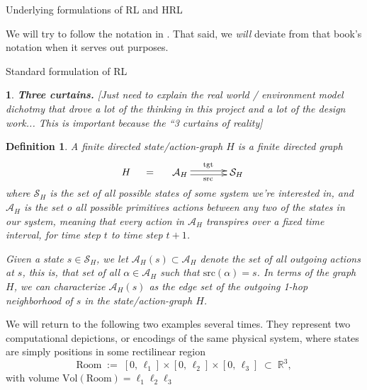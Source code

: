 \documentclass[11pt]{article}
\newtheorem{definition}[subsubsection]{Definition}
\newtheorem{ermark}[subsubsection]{}
\begin{document}
\begin{section}{Underlying formulations of RL and HRL}

We will try to follow the notation in \cite[pp. xix-xxii]{SBRL}. That said, we {\em will} deviate from that book's notation when it serves out purposes.

\begin{subsection}{Standard formulation of RL}

\begin{ermark}
{\bf Three curtains.}
\normalfont
{\color{blue} [Just need to explain the real world / environment model dichotmy that drove a lot of the thinking in this project and a lot of the design work... This is important because the ``3 curtains of reality]}
\end{ermark}
 
\begin{definition}
\normalfont
A finite directed {\em state/action-graph} $H$ is a finite directed graph
\begin{equation}\label{eq:H src tgt}
H\;\quad=\quad\;
\begin{xy}
(0,0)*+{\mathcal{A}_{H}}="1";
(20,0)*+{\mathcal{S}_{H}}="2";
{\ar@<2pt>^{\text{tgt}} "1"; "2"}
{\ar@<-2pt>_{\text{src}} "1"; "2"}
\end{xy}
\end{equation}
where $\mathcal{S}_{H}$ is the set of all possible states of some system we're interested in, and $\mathcal{A}_{H}$ is the set o all possible primitives actions between any two of the states in our system, meaning that every action in $\mathcal{A}_{H}$ transpires over a fixed time interval, for time step $t$ to time step $t+1$.

Given a state $s\in\mathcal{S}_{H}$, we let $\mathcal{A}_{H}(s)\subset \mathcal{A}_{H}$ denote the set of all outgoing actions at $s$, this is, that set of all $\alpha\in\mathcal{A}_{H}$ such that
$\text{src}(\alpha)=s$. In terms of the graph $H$, we can characterize $\mathcal{A}_{H}(s)$ as the edge set of the outgoing 1-hop neighborhood of $s$ in the state/action-graph $H$.
\end{definition}

\noindent
We will return to the following two examples several times. They represent two computational depictions, or encodings of the same physical system, where states are simply positions in some rectilinear region
$$
\text{Room}
\;:=\;
[0,\,\ell_1]\times[0,\,\ell_2]\times[0,\,\ell_3]\;\subset\;\mathbb{R}^{3},
$$
with volume $\text{Vol}(\text{Room})=\ell_{1}\ell_{2}\ell_{3}$


\end{subsection}
\end{section}
\end{document}
